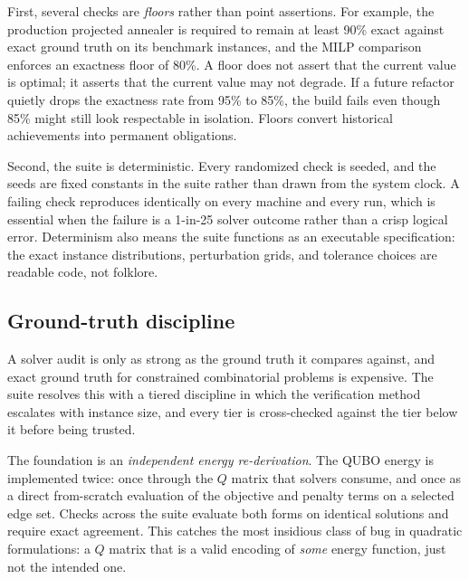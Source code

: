 First, several checks are \emph{floors} rather than point assertions. For
example, the production projected annealer is required to remain at least
90\% exact against exact ground truth on its benchmark instances, and the
MILP comparison enforces an exactness floor of 80\%. A floor does not
assert that the current value is optimal; it asserts that the current value
may not degrade. If a future refactor quietly drops the exactness rate from
95\% to 85\%, the build fails even though 85\% might still look respectable
in isolation. Floors convert historical achievements into permanent
obligations.

Second, the suite is deterministic. Every randomized check is seeded, and
the seeds are fixed constants in the suite rather than drawn from the
system clock. A failing check reproduces identically on every machine and
every run, which is essential when the failure is a 1-in-25 solver outcome
rather than a crisp logical error. Determinism also means the suite
functions as an executable specification: the exact instance distributions,
perturbation grids, and tolerance choices are readable code, not folklore.

\subsection{Ground-truth discipline}
\label{sec:groundtruth}

A solver audit is only as strong as the ground truth it compares against,
and exact ground truth for constrained combinatorial problems is
expensive. The suite resolves this with a tiered discipline in which the
verification method escalates with instance size, and every tier is
cross-checked against the tier below it before being trusted.

The foundation is an \emph{independent energy re-derivation}. The QUBO
energy is implemented twice: once through the $Q$ matrix that solvers
consume, and once as a direct from-scratch evaluation of the objective and
penalty terms on a selected edge set. Checks across the suite evaluate both
forms on identical solutions and require exact agreement. This catches the
most insidious class of bug in quadratic formulations: a $Q$ matrix that is
a valid encoding of \emph{some} energy function, just not the intended one.

